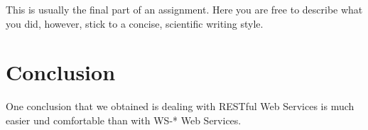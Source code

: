 \documentclass{report}
\begin{document}
This is usually the final part of an assignment.
Here you are free to describe what you did, however, stick to a concise, scientific writing style.

\section{Conclusion}

One conclusion that we obtained is dealing with RESTful Web Services is much easier und comfortable than with WS-* Web Services.



\end{document}
